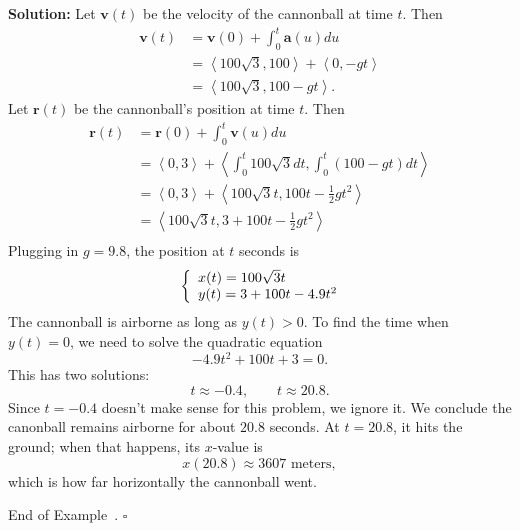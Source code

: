 \documentclass[10pt]{article}
\theoremstyle{definition}
\newtheorem{example}[theorem]{Example}
\renewenvironment{example}
{\begin{oldexample}}
  {\par\smallskip\hfill   End of Example~\theexample. $\square$    \par\end{oldexample}}
\newcommand{\1}[1]{\textbf{1}_{\left[#1\right]}} %
\begin{document}
\begin{example}
  \textbf{Solution:}
  Let $\mathbf{v}(t)$ be the velocity of the cannonball at time $t$. Then
  \begin{align*}
    \mathbf{v}(t) 
    &= \mathbf{v}(0) + \int_{0}^{t} \mathbf{a}(u)du\\
    &= \left\langle 100 \sqrt{3},100 \right\rangle + \left\langle 0,-g t \right\rangle\\  
    &= \left\langle 100 \sqrt{3}, 100-gt \right\rangle.
  \end{align*}
  Let $\mathbf{r}(t)$ be the cannonball's position at time $t$. Then
  \begin{align*}
    \mathbf{r}(t) 
    &= \mathbf{r}(0)+\int_{0}^{t} \mathbf{v}(u)du\\ 
    &= \left\langle 0,3 \right\rangle  + \left\langle \int_{0}^{t}100 \sqrt{3} dt, \int_{0}^{t}(100-gt)dt    \right\rangle\\ 
    &= \left\langle 0,3 \right\rangle  + \left\langle 100 \sqrt{3}t, 100t-\frac{1}{2}gt^{2}    \right\rangle\\ 
    &= \left\langle 100 \sqrt{3}t, 3+100t-\frac{1}{2}gt^{2}    \right\rangle\\ 
  \end{align*}
  Plugging in $g= 9.8$, the position at $t$ seconds is 
  \begin{equation}\label{eq:8}
    \left\{ \begin{array}{l@{}l}
        x(t) = 100 \sqrt{3}t \\
        y(t) = 3+100 t - 4.9t^{2}
      \end{array}\right.
  \end{equation}
  The cannonball is airborne as long as $y(t)>0$. To find the time when $y(t)=0$, we need to solve the
  quadratic equation
  \begin{equation*}
    -4.9t^{2}+ 100 t +3=0.
  \end{equation*}
  This has two solutions:
  \begin{equation*}
    t\approx -0.4, \qquad t\approx 20.8.
  \end{equation*}
  Since $t=-0.4$ doesn't make sense for this problem, we ignore it. We
  conclude the canonball remains airborne for about $20.8$ seconds. At
  $t=20.8$, it hits the ground; when that happens, its $x$-value is
  \begin{equation*}
    x(20.8) \approx 3607 \text{ meters},
  \end{equation*}
  which is how far horizontally the cannonball went.
  

\end{example}
\end{document}
